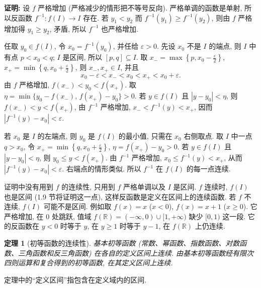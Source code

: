 \documentclass[UTF8,openany]{ctexbook}
\theoremstyle{chinesetextbook}
\newtheorem{theorem}{定理}[section]
\newenvironment{cnproof}{\par\indent\textbf{证明:} \ignorespaces}{\par}
\begin{document}
\begin{cnproof}
设 $f$ 严格增加 (严格减少的情形把不等号反向). 严格单调的函数是单射, 所以反函数 $f^{-1}:f(I)\to I$ 存在. 若 $y_1<y_2$ 而 $f^{-1}(y_1)\ge f^{-1}(y_2)$, 则由 $f$ 严格增加得 $y_1\ge y_2$, 矛盾, 所以 $f^{-1}$ 也严格增加.

任取 $y_0\in f(I)$, 令 $x_0=f^{-1}(y_0)$, 并任给 $\varepsilon>0$. 先设 $x_0$ 不是 $I$ 的端点, 则 $I$ 中有点 $p<x_0<q$; $I$ 是区间, 所以 $[p,q]\subseteq I$. 取 $\displaystyle x_-=\max\left\{p,x_0-\frac\varepsilon2\right\}$, $\displaystyle x_+=\min\left\{q,x_0+\frac\varepsilon2\right\}$, 则 $x_-,x_+\in I$, 并且
\[
x_0-\varepsilon<x_-<x_0<x_+<x_0+\varepsilon.
\]
由 $f$ 严格增加, $f(x_-)<y_0<f(x_+)$. 取 $\eta=\min\{y_0-f(x_-),\,f(x_+)-y_0\}>0$. 若 $y\in f(I)$ 且 $|y-y_0|<\eta$, 则 $f(x_-)<y<f(x_+)$, 由 $f^{-1}$ 严格增加, $x_-<f^{-1}(y)<x_+$, 因而 $|f^{-1}(y)-x_0|<\varepsilon$.

若 $x_0$ 是 $I$ 的左端点, 则 $y_0$ 是 $f(I)$ 的最小值, 只需在 $x_0$ 右侧取点. 取 $I$ 中一点 $q>x_0$, 令 $\displaystyle x_+=\min\left\{q,x_0+\frac\varepsilon2\right\}$, $\eta=f(x_+)-y_0>0$. 若 $y\in f(I)$ 且 $|y-y_0|<\eta$, 则 $y_0\le y<f(x_+)$. 由 $f^{-1}$ 严格增加, $x_0\le f^{-1}(y)<x_+$, 从而 $|f^{-1}(y)-x_0|<\varepsilon$. 右端点的情形类似. 所以 $f^{-1}$ 在 $f(I)$ 的每一点连续.
\end{cnproof}
证明中没有用到 $f$ 的连续性, 只用到 $f$ 严格单调以及 $I$ 是区间. $f$ 连续时, $f(I)$ 也是区间 (1.9 节将证明这一点), 这样反函数是定义在区间上的连续函数. 若 $f$ 不连续, $f(I)$ 可能不是区间. 例如取 $f(x)=x$ ($x<0$), $f(x)=x+1$ ($x\ge0$). 它严格增加, 在 $0$ 处跳跃, 值域 $f(\mathbb R)=(-\infty,0)\cup[1,+\infty)$ 缺少 $[0,1)$ 这一段. 它的反函数在 $y<0$ 时等于 $y$, 在 $y\ge1$ 时等于 $y-1$, 在 $f(\mathbb R)$ 上仍连续.
\begin{theorem}[初等函数的连续性]
基本初等函数 (常数、幂函数、指数函数、对数函数、三角函数和反三角函数) 在各自的定义区间上连续. 由基本初等函数经有限次四则运算和复合得到的初等函数, 在其定义区间上连续.
\end{theorem}
定理中的“定义区间”指包含在定义域内的区间.
\end{document}
